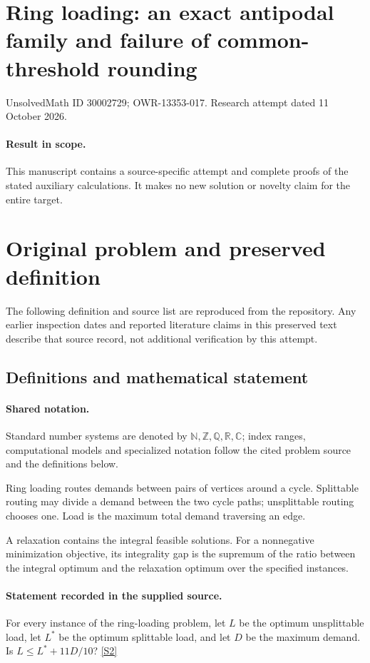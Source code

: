 \documentclass[11pt]{article}
\begin{document}
\section*{Ring loading: an exact antipodal family and failure of common-threshold rounding}
\noindent UnsolvedMath ID 30002729; OWR-13353-017. Research attempt dated 11 October 2026.
\paragraph{Result in scope.}This manuscript contains a source-specific attempt and complete proofs of the stated auxiliary calculations. It makes no new solution or novelty claim for the entire target.
\section{Original problem and preserved definition}
The following definition and source list are reproduced from the repository. Any earlier inspection dates and reported literature claims in this preserved text describe that source record, not additional verification by this attempt.
\subsection{Definitions and mathematical statement}

\paragraph{Shared notation.}Standard number systems are denoted by $\mathbb N,\mathbb Z,\mathbb Q,\mathbb R,\mathbb C$; index ranges, computational models and specialized notation follow the cited problem source and the definitions below.


Ring loading routes demands between pairs of vertices around a cycle. Splittable routing may divide a demand between the two cycle paths; unsplittable routing chooses one. Load is the maximum total demand traversing an edge.

A relaxation contains the integral feasible solutions. For a nonnegative minimization objective, its integrality gap is the supremum of the ratio between the integral optimum and the relaxation optimum over the specified instances.
\paragraph{Statement recorded in the supplied source.}
For every instance of the ring-loading problem, let $L$ be the optimum unsplittable load, let $L^*$ be the optimum splittable load, and let $D$ be the maximum demand. Is $L\leq L^*+11D/10$? \href{https://doi.org/10.4171/owr/2014/51}{[S2]}
\end{document}
